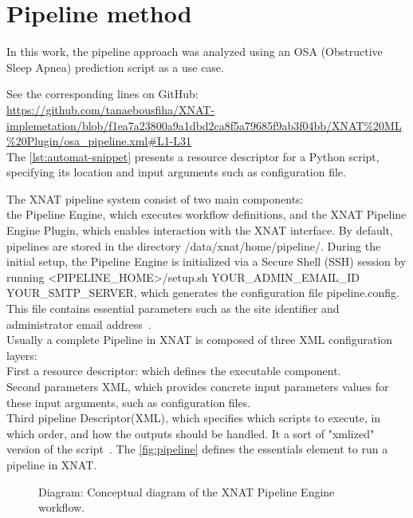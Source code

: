 
\section{Pipeline method}
In this work, the pipeline approach was analyzed using an OSA (Obstructive Sleep Apnea) prediction script as a use case.
\normalsize



\noindent\footnotesize See the corresponding lines on GitHub:\url{ https://github.com/tanaebousfiha/XNAT-implemetation/blob/f1ea7a23800a9a1dbd2ca8f5a79685f9ab3f04bb/XNAT%20ML%20Plugin/osa_pipeline.xml#L1-L31}
\normalsize
\\
The \autoref{lst:automat-snippet} presents a resource descriptor for a Python script, specifying its location and input arguments such as configuration file.

The XNAT pipeline system consist of two main components: \\
the Pipeline Engine, which executes workflow definitions, and the XNAT Pipeline Engine Plugin, which enables interaction with the XNAT interface.
By default, pipelines are stored in the directory /data/xnat/home/pipeline/. During the initial setup, the Pipeline Engine is initialized via a Secure Shell (SSH) session by running
<PIPELINE\_HOME>/setup.sh YOUR\_ADMIN\_EMAIL\_ID YOUR\_SMTP\_SERVER,
which generates the configuration file pipeline.config. This file contains essential parameters such as the site identifier and administrator email address~\cite{configpip}.\\
Usually a complete Pipeline in XNAT is composed of three XML configuration layers:\\
First a resource descriptor: which defines the executable component. \\
Second parameters XML, which provides concrete input parameters values for these input arguments, such as configuration files.\\
Third pipeline Descriptor(XML), which  specifies which scripts to execute, in which order, and how the outputs should be handled. It a sort of "xmlized" version of the script~\cite{pipelinediscussion}. The \autoref{fig:pipeline} defines the essentials element to run a pipeline in XNAT. 
\begin{figure}[H]
    \centering
    \def\svgwidth{0.7\linewidth}
    
    \caption{ Diagram: Conceptual diagram of the XNAT Pipeline Engine workflow.}
    \label{fig:pipeline}
\end{figure}


